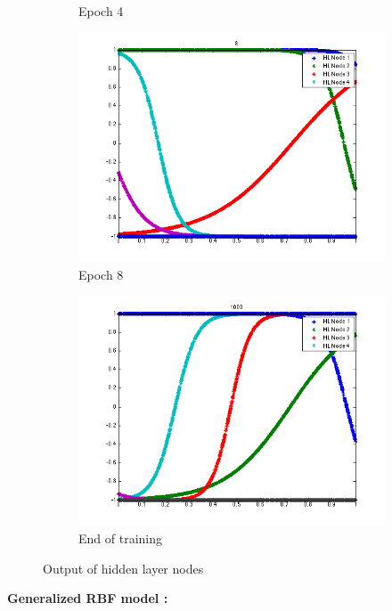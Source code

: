 \documentclass{article}
\begin{document}
\begin{figure}
\begin{subfigure}{.5\textwidth}
  \caption{Epoch 4}
\end{subfigure}%
\begin{subfigure}{.5\textwidth}
  \centering
  \includegraphics[width=.8\linewidth]{Regression/univariate/hiddenLayer_8.png}
   \caption{Epoch 8}
  \end{subfigure}
  
  \begin{subfigure}{0.5\textwidth}
  \centering
  \includegraphics[width=0.8\linewidth]{Regression/univariate/hiddenLayer_1000.png}
   \caption{End of training}
  \end{subfigure}
  
\caption{Output of hidden layer nodes}
\end{figure}

\textbf{Generalized RBF model :}
\end{document}
